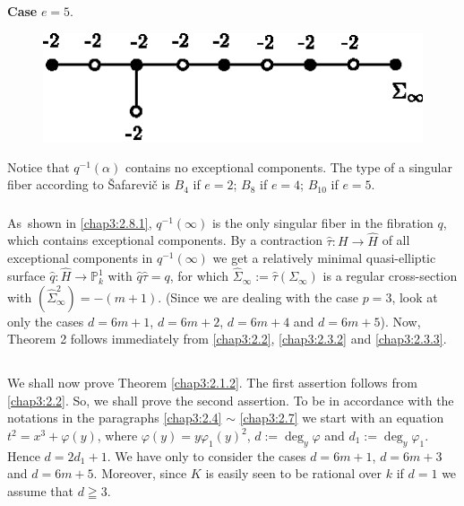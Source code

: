 \noindent
{\bf Case} $e=5$.
\begin{figure}[H]
\centering
\includegraphics{figures/miyansi_fig24.eps}
\end{figure}
Notice that $q^{-1}(\alpha)$ contains no exceptional components. The
type of a singular fiber according to \v{S}afarevi\v{c} \cite{51} is
$B_{4}$ if $e=2$; $B_{8}$ if $e=4$; $B_{10}$ if $e=5$.

\subsubsection{}\label{chap3:2.8.2}
As\pageoriginale\ shown in \ref{chap3:2.8.1}, $q^{-1}(\infty)$ is the only
singular fiber in the fibration $q$, which contains exceptional
components. By a contraction $\widehat{\tau}:H\to \widehat{H}$ of all
exceptional components in $q^{-1}(\infty)$ we get a relatively minimal
quasi-elliptic surface $\widehat{q}:\widehat{H}\to \mathbb{P}^{1}_{k}$
with $\widehat{q}\widehat{\tau}=q$, for which
$\widehat{\Sigma}_{\infty}:=\widehat{\tau}(\Sigma_{\infty})$ is a
regular cross-section with
$(\widehat{\Sigma}^{2}_{\infty})=-(m+1)$. (Since we are dealing with
the case $p=3$, look at only the cases $d=6m+1$, $d=6m+2$, $d=6m+4$
and $d=6m+5$). Now, Theorem 2 follows immediately from \ref{chap3:2.2},
\ref{chap3:2.3.2} and \ref{chap3:2.3.3}.

\subsection{}\label{chap3:2.9}
We shall now prove Theorem \ref{chap3:2.1.2}. The first assertion follows
from \ref{chap3:2.2}. So, we shall prove the second assertion. To be in
accordance with the notations in the paragraphs \ref{chap3:2.4} $\sim$
\ref{chap3:2.7} we start with an equation $t^{2}=x^{3}+\varphi(y)$, where
$\varphi(y)=y\varphi_{1}(y)^{2}$, $d:=\deg_{y}\varphi$ and
$d_{1}:=\deg_{y}\varphi_{1}$. Hence $d=2d_{1}+1$. We have only to
consider the cases $d=6m+1$, $d=6m+3$ and $d=6m+5$. Moreover, since
$K$ is easily seen to be rational over $k$ if $d=1$ we assume that
$d\geqq 3$.

